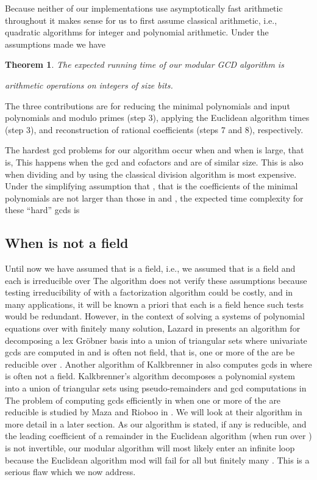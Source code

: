 \documentclass[10pt]{article}
\newtheorem{theorem}{Theorem}
\begin{document}
Because neither of our implementations use asymptotically
fast arithmetic throughout it makes sense for us to first assume
classical arithmetic, i.e., quadratic algorithms for integer
and polynomial arithmetic.  Under the assumptions made we have
\begin{theorem}
\label{theorem2}
The expected running time of our modular GCD algorithm is

arithmetic operations on integers of size  bits.
\end{theorem}
The three contributions are for reducing the minimal polynomials 
and input polynomials  and  modulo  primes (step 3),
applying the Euclidean algorithm  times (step 3),
and reconstruction of  rational coefficients (steps 7 and 8),
respectively.

The hardest gcd problems for our algorithm occur when  and when  is large, that is,   This happens
when the gcd  and cofactors  and  are of
similar size. This is also when dividing  and  by 
using the classical division algorithm is most expensive. Under the
simplifying assumption that , that is the coefficients of
the minimal polynomials are not larger than those in  and
, the expected time complexity for these ``hard'' gcds is 

 
\subsection{When  is not a field}
Until now we have assumed that  is a field, i.e., we assumed
that  is a field and each  is irreducible over 
The algorithm does not verify these assumptions because testing
irreducibility of  with a factorization algorithm could be costly,
and in many applications, it will be known a priori that
each  is a field hence such tests would be redundant.
However, in the context of solving a systems of polynomial equations
over  with finitely many solution, Lazard in \cite{Lazard} presents
an algorithm for decomposing a lex Gr\"obner basis into a union of triangular sets
where univariate gcds are computed in  and  is often not field,
that is, one or more of the  are be reducible over .
Another algorithm of Kalkbrenner in \cite{Kalkbrenner} also computes
gcds in  where  is often not a field.
Kalkbrenner's algorithm decomposes a polynomial system into
a union of triangular sets using pseudo-remainders and gcd computations in 
The problem of computing gcds efficiently in  when one or more of the
 are reducible is studied by Maza and Rioboo in \cite{Maza}.
We will look at their algorithm in more detail in a later section.
As our algorithm is stated, if any  is reducible, and
the leading coefficient of a remainder in the Euclidean algorithm
(when run over ) is not invertible, our modular algorithm
will most likely enter an infinite loop because the
Euclidean algorithm mod  will fail for all but finitely many .
This is a serious flaw which we now address.
\end{document}
